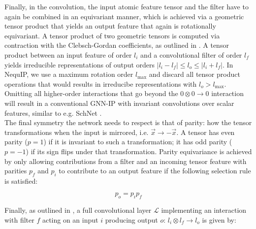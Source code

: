 \documentclass[11pt]{article}
\begin{document}
Finally, in the convolution, the input atomic feature tensor and the filter have to again be combined in an equivariant manner, which is achieved via a geometric tensor product that yields an output feature that again is rotationally equivariant. A tensor product of two geometric tensors is computed via contraction with the Clebsch-Gordan coefficients, as outlined in \cite{thomas2018tensor}. A tensor product between an input feature of order $l_i$ and a convolutional filter of order $l_f$ yields irreducible representations of output orders $|l_i - l_f| \leq l_o \leq |l_i + l_f| $. In NequIP, we use a maximum rotation order $l_{\text{max}}$ and discard all tensor product operations that would results in irreducibe representations with $l_o > l_{\text{max}}$. Omitting all higher-order interactions that go beyond the $0 \otimes 0 \rightarrow 0$ interaction will result in a conventional GNN-IP with invariant convolutions over scalar features, similar to e.g. SchNet \cite{schnet_neurips}.\\

The final symmetry the network needs to respect is that of parity: how the tensor transformations when the input is mirrored, i.e. $\vec{x} \rightarrow -\vec{x}$. A tensor has even parity ($p = 1$) if it is invariant to such a transformation; it has odd parity ($p = -1$) if its sign flips under that transformation. Parity equivariance is achieved by only allowing contributions from a filter and an incoming tensor feature with  parities $p_f$ and $p_i$ to contribute to an output feature if the following selection rule is satisfied:

\begin{equation}
    p_o = p_i p_f
\end{equation}

Finally, as outlined in \cite{thomas2018tensor}, a full convolutional layer $\mathcal{L}$ implementing an interaction with filter $f$ acting on an input $i$ producing output $o$: $l_i \otimes l_f  \rightarrow l_o$ is given by: 
\end{document}
